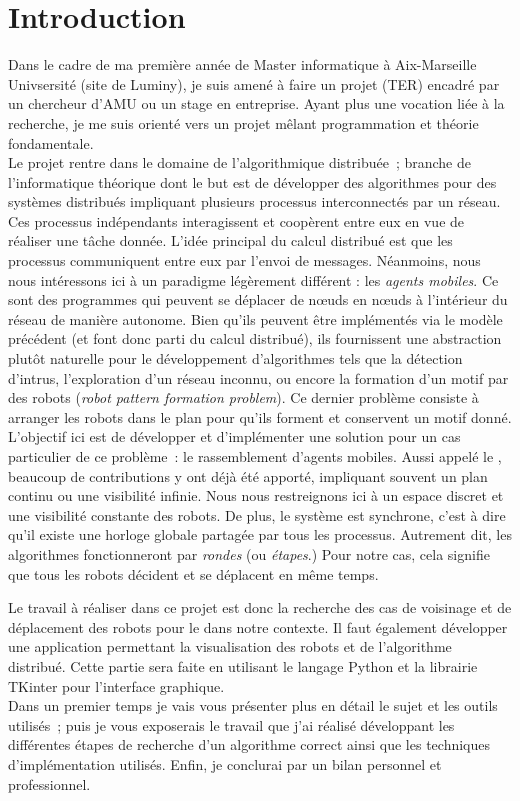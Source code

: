 \section*{Introduction}
Dans le cadre de ma première année de Master informatique à Aix-Marseille
Univsersité (site de Luminy), je suis amené à faire un projet (TER) encadré par
un chercheur d'AMU ou un stage en entreprise. Ayant plus une vocation liée à la
recherche, je me suis orienté vers un projet mêlant programmation et théorie
fondamentale. \\

Le projet rentre dans le domaine de l'algorithmique distribuée~; branche de
l'informatique théorique dont le but est de développer des algorithmes pour des
systèmes distribués impliquant plusieurs processus interconnectés par un
réseau. Ces processus indépendants interagissent et coopèrent entre eux en vue
de réaliser une tâche donnée.  L'idée principal du calcul distribué est que les
processus communiquent entre eux par l'envoi de messages. Néanmoins, nous nous
intéressons ici à un paradigme légèrement différent : les \textit{agents
mobiles}. Ce sont des programmes qui peuvent se déplacer de n\oe{}uds en
n\oe{}uds à l'intérieur du réseau de manière autonome. Bien qu'ils peuvent être
implémentés via le modèle précédent (et font donc parti du calcul distribué),
ils fournissent une abstraction plutôt naturelle pour le développement
d'algorithmes tels que la détection d'intrus, l'exploration d'un réseau
inconnu, ou encore la formation d'un motif par des robots (\textit{robot
pattern formation problem}). Ce dernier problème consiste à arranger les robots
dans le plan pour qu'ils forment et conservent un motif donné. \\

L'objectif ici est de développer et d'implémenter une solution pour un cas
particulier de ce problème~: le rassemblement d'agents mobiles. Aussi appelé le
\GatheringProblem, beaucoup de contributions y ont déjà été apporté, impliquant
souvent un plan continu ou une visibilité infinie. Nous nous restreignons ici à
un espace discret et une visibilité constante des robots. De plus, le système
est synchrone, c'est à dire qu'il existe une horloge globale partagée par tous
les processus. Autrement dit, les algorithmes fonctionneront par
\textit{rondes} (ou \textit{étapes}.) Pour notre cas, cela signifie que tous
les robots décident et se déplacent en même temps.

Le travail à réaliser dans ce projet est donc la recherche des cas de voisinage
et de déplacement des robots pour le \GatheringProblem dans notre contexte. Il
faut également développer une application permettant la visualisation des
robots et de l'algorithme distribué. Cette partie sera faite en utilisant le
langage Python et la librairie TKinter pour l'interface graphique. \\

Dans un premier temps je vais vous présenter plus en détail le sujet et les
outils utilisés~; puis je vous exposerais le travail que j'ai réalisé
développant les différentes étapes de recherche d'un algorithme correct ainsi
que les techniques d'implémentation utilisés. Enfin, je conclurai par un bilan
personnel et professionnel.
